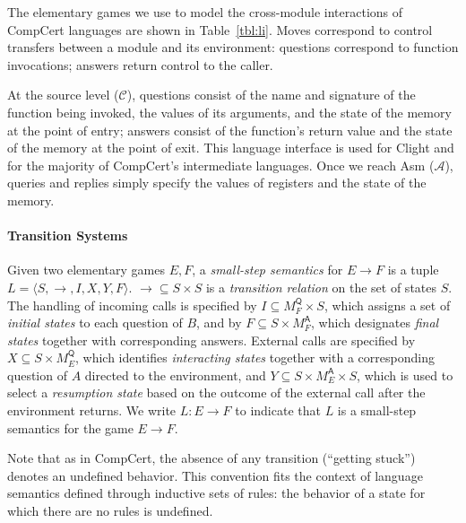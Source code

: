 \documentclass[sigplan,10pt,review,anonymous]{acmart}
\newcommand{\kw}[1]{\ensuremath{ \mathsf{#1} }}
\begin{document}
The elementary games we use to model
the cross-module interactions of CompCert languages
are shown in Table~\ref{tbl:li}.
Moves correspond to control transfers
between a module and its environment:
questions correspond to function invocations;
answers return control to the caller.

At the source level ($\mathcal{C}$),
questions consist of
the name and signature of the function being invoked,
the values of its arguments,
and the state of the memory at the point of entry;
answers
consist of the function's return value
and the state of the memory at the point of exit.
This language interface is used for Clight and
for the majority of CompCert's intermediate languages.
Once we reach Asm ($\mathcal{A}$),
queries and replies simply specify
the values of registers and the state of the memory.


\paragraph{Transition Systems} %

\cbdelete

\begin{definition}
Given two elementary games $E, F$,
a \emph{small-step semantics} for $E \rightarrow F$
is a tuple $L = \langle S, \rightarrow, I, X, Y, F \rangle$.
${\rightarrow} \subseteq S \times S$ is a \emph{transition relation} on
the set of states $S$.
The handling of incoming calls is specified by
$I \subseteq M_F^\kw{Q} \times S$, which
assigns a set of \emph{initial states} to each question of $B$, and by
$F \subseteq S \times M_F^\kw{A}$,
which designates \emph{final states} together with corresponding answers.
External calls are specified by
$X \subseteq S \times M_E^\kw{Q}$,
which identifies \emph{interacting states} together with
a corresponding question of $A$ directed to the environment, and
$Y \subseteq S \times M_E^\kw{A} \times S$,
which is used to select a \emph{resumption state}
based on the outcome of the external call
after the environment returns.
We write $L : E \rightarrow F$ to indicate that
$L$ is a small-step semantics for the game $E \rightarrow F$.
\end{definition}

Note that as
in CompCert, the absence of any transition (``getting stuck'')
denotes an undefined behavior.
This convention fits the context of
language semantics defined through inductive sets of rules:
the behavior of a state for which there are no rules is undefined.
\end{document}
